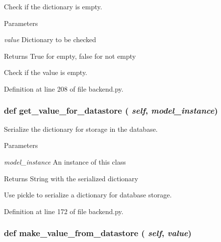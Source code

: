 Check if the dictionary is empty. 


\begin{DoxyParams}{Parameters}
\item[{\em value}]Dictionary to be checked \end{DoxyParams}
\begin{DoxyReturn}{Returns}
True for empty, false for not empty\begin{DoxyVerb}Check if the value is empty.\end{DoxyVerb}
 
\end{DoxyReturn}


Definition at line 208 of file backend.py.

\hypertarget{classbackend_1_1_dict_property_a54cc138e6df3ad55c38fa5db72327963}{
\subsubsection[{get\_\-value\_\-for\_\-datastore}]{\setlength{\rightskip}{0pt plus 5cm}def get\_\-value\_\-for\_\-datastore ( {\em self}, \/   {\em model\_\-instance})}}
\label{classbackend_1_1_dict_property_a54cc138e6df3ad55c38fa5db72327963}


Serialize the dictionary for storage in the database. 


\begin{DoxyParams}{Parameters}
\item[{\em model\_\-instance}]An instance of this class \end{DoxyParams}
\begin{DoxyReturn}{Returns}
String with the serialized dictionary\begin{DoxyVerb}Use pickle to serialize a dictionary for database storage.\end{DoxyVerb}
 
\end{DoxyReturn}


Definition at line 172 of file backend.py.

\hypertarget{classbackend_1_1_dict_property_a464c5a5f52df989128b5fc067ea34512}{
\subsubsection[{make\_\-value\_\-from\_\-datastore}]{\setlength{\rightskip}{0pt plus 5cm}def make\_\-value\_\-from\_\-datastore ( {\em self}, \/   {\em value})}}
\label{classbackend_1_1_dict_property_a464c5a5f52df989128b5fc067ea34512}


